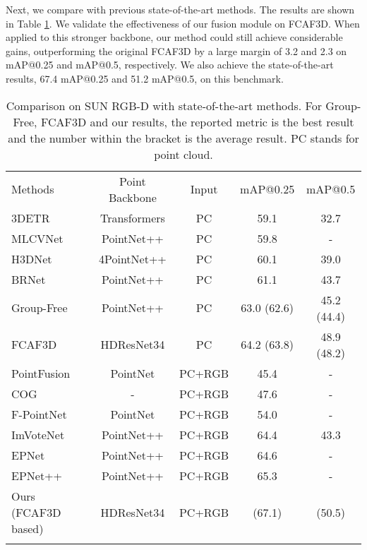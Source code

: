 \documentclass[runningheads]{llncs}
\begin{document}
Next, we compare with previous state-of-the-art methods. The results are shown in Table \ref{table:sota}. We validate the effectiveness of our fusion module on FCAF3D. When applied to this stronger backbone, our method could still achieve considerable gains, outperforming the original FCAF3D by a large margin of 3.2 and 2.3 on mAP@0.25 and mAP@0.5, respectively. We also achieve the state-of-the-art results, 67.4 mAP@0.25 and 51.2 mAP@0.5, on this benchmark.

\setlength{\tabcolsep}{5pt}
\begin{table}[t]
\begin{center}
\caption{Comparison on SUN RGB-D with state-of-the-art methods. For Group-Free, FCAF3D and our results, the reported metric is the best result and the number within the bracket is the average result. PC stands for point cloud.}
\vspace{6pt}
\label{table:sota}
\begin{tabular}{lcccc}
\Xhline{0.8pt}\noalign{\smallskip}
Methods & Point Backbone & Input & mAP@0.25 & mAP@0.5\\
\noalign{\smallskip}
\hline
\noalign{\smallskip}
3DETR~\cite{misra2021end} & Transformers & PC & 59.1 & 32.7\\
MLCVNet~\cite{xie2020mlcvnet} & PointNet++ & PC & 59.8 & -\\
H3DNet~\cite{zhang2020h3dnet} & 4PointNet++ & PC & 60.1 & 39.0\\
BRNet~\cite{cheng2021back} & PointNet++ & PC & 61.1 & 43.7\\
Group-Free~\cite{liu2021group} & PointNet++ & PC & 63.0 (62.6) & 45.2 (44.4)\\
FCAF3D~\cite{rukhovich2021fcaf3d} & HDResNet34 & PC & 64.2 (63.8) & 48.9 (48.2)\\
PointFusion\cite{xu2018pointfusion} &  PointNet & PC+RGB & 45.4 & -\\
COG\cite{7780538} &  - & PC+RGB & 47.6 & -\\
F-PointNet~\cite{qi2018frustum} &  PointNet & PC+RGB & 54.0 & -\\
ImVoteNet~\cite{qi2020imvotenet} & PointNet++  & PC+RGB & 64.4 & 43.3\\
EPNet~\cite{10.1007/978-3-030-58555-6_3} & PointNet++ & PC+RGB & 64.6 & -\\
EPNet++~\cite{liu2022epnet} & PointNet++ & PC+RGB & 65.3 & -\\
Ours (FCAF3D based)& HDResNet34 & PC+RGB &  (67.1) &  (50.5) \\
\Xhline{0.8pt}
\end{tabular}
\end{center}
\end{table}
\setlength{\tabcolsep}{1.4pt}
\end{document}

